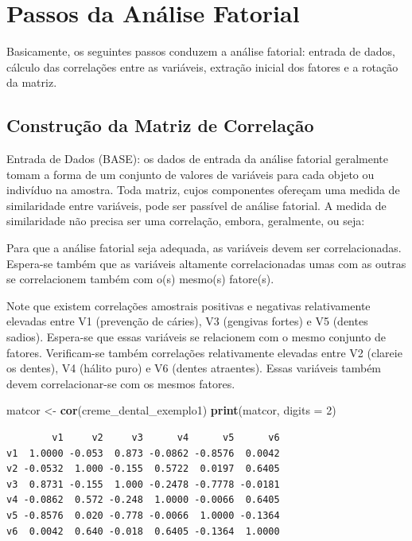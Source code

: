 \documentclass[12pt,brazil,oneside]{book}
\newenvironment{Shaded}{\begin{snugshade}}{\end{snugshade}}
\newcommand{\DataTypeTok}[1]{\textcolor[rgb]{0.13,0.29,0.53}{#1}}
\newcommand{\DecValTok}[1]{\textcolor[rgb]{0.00,0.00,0.81}{#1}}
\newcommand{\KeywordTok}[1]{\textcolor[rgb]{0.13,0.29,0.53}{\textbf{#1}}}
\newcommand{\NormalTok}[1]{#1}
\newcommand{\StringTok}[1]{\textcolor[rgb]{0.31,0.60,0.02}{#1}}
\begin{document}
\hypertarget{passos-da-analise-fatorial}{%
\section{Passos da Análise Fatorial}\label{passos-da-analise-fatorial}}

Basicamente, os seguintes passos conduzem a análise fatorial: entrada de
dados, cálculo das correlações entre as variáveis, extração inicial dos
fatores e a rotação da matriz.

\hypertarget{construcao-da-matriz-de-correlacao}{%
\subsection{Construção da Matriz de
Correlação}\label{construcao-da-matriz-de-correlacao}}

Entrada de Dados (BASE): os dados de entrada da análise fatorial
geralmente tomam a forma de um conjunto de valores de variáveis para
cada objeto ou indivíduo na amostra. Toda matriz, cujos componentes
ofereçam uma medida de similaridade entre variáveis, pode ser passível
de análise fatorial. A medida de similaridade não precisa ser uma
correlação, embora, geralmente, ou seja:

Para que a análise fatorial seja adequada, as variáveis devem ser
correlacionadas. Espera-se também que as variáveis altamente
correlacionadas umas com as outras se correlacionem também com o(s)
mesmo(s) fatore(s).

Note que existem correlações amostrais positivas e negativas
relativamente elevadas entre V1 (prevenção de cáries), V3 (gengivas
fortes) e V5 (dentes sadios). Espera-se que essas variáveis se
relacionem com o mesmo conjunto de fatores. Verificam-se também
correlações relativamente elevadas entre V2 (clareie os dentes), V4
(hálito puro) e V6 (dentes atraentes). Essas variáveis também devem
correlacionar-se com os mesmos fatores.

\begin{Shaded}
\begin{Highlighting}[]
\NormalTok{matcor <-}\StringTok{ }\KeywordTok{cor}\NormalTok{(creme_dental_exemplo1)}
\KeywordTok{print}\NormalTok{(matcor, }\DataTypeTok{digits =} \DecValTok{2}\NormalTok{)}
\end{Highlighting}
\end{Shaded}

\begin{verbatim}
        v1     v2     v3      v4      v5      v6
v1  1.0000 -0.053  0.873 -0.0862 -0.8576  0.0042
v2 -0.0532  1.000 -0.155  0.5722  0.0197  0.6405
v3  0.8731 -0.155  1.000 -0.2478 -0.7778 -0.0181
v4 -0.0862  0.572 -0.248  1.0000 -0.0066  0.6405
v5 -0.8576  0.020 -0.778 -0.0066  1.0000 -0.1364
v6  0.0042  0.640 -0.018  0.6405 -0.1364  1.0000
\end{verbatim}
\end{document}
